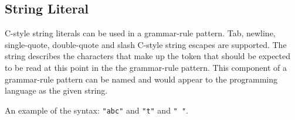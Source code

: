 
\subsection{String Literal}
{
	C-style string literals can be used in a grammar-rule pattern.
	Tab, newline, single-quote, double-quote and slash C-style string
	escapes are supported.
	The string describes the characters that make up the token that should be
	expected
	to be read at this point in the the grammar-rule pattern.
	This component of a grammar-rule pattern can be named and would appear to
	the programming language as the given string.
	
	An example of the syntax: \texttt{"abc"} and \texttt{"t"} and \texttt{" "}.
}
